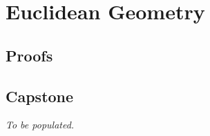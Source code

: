 \chapter{Euclidean Geometry}


\clearpage

\section*{Proofs}

\section*{Capstone}
\textit{To be populated.}
